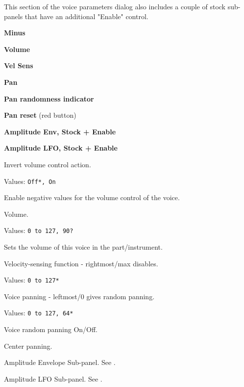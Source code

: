    This section of the voice parameters dialog also includes a couple of
   stock sub-panels that have an additional "Enable" control.

   \begin{enumber}
      \item \textbf{Minus}
      \item \textbf{Volume}
      \item \textbf{Vel Sens}
      \item \textbf{Pan}
      \item \textbf{Pan randomness indicator}
      \item \textbf{Pan reset} (red button)
      \item \textbf{Amplitude Env, Stock + Enable}
      \item \textbf{Amplitude LFO, Stock + Enable}
   \end{enumber}

   \setcounter{ItemCounter}{0}      %

   Invert volume control action.

   Values: \texttt{Off*, On}

   Enable negative values for the volume control of the voice.

   Volume.

   Values: \texttt{0 to 127, 90?}

   Sets the volume of this voice in the part/instrument.

   Velocity-sensing function - rightmost/max disables.

   Values: \texttt{0 to 127*}

   Voice panning - leftmost/0 gives random panning.

   Values: \texttt{0 to 127, 64*}

   Voice random panning On/Off.

   Center panning.

   Amplitude Envelope Sub-panel.
   See
   .

   Amplitude LFO Sub-panel.
   See
   .

